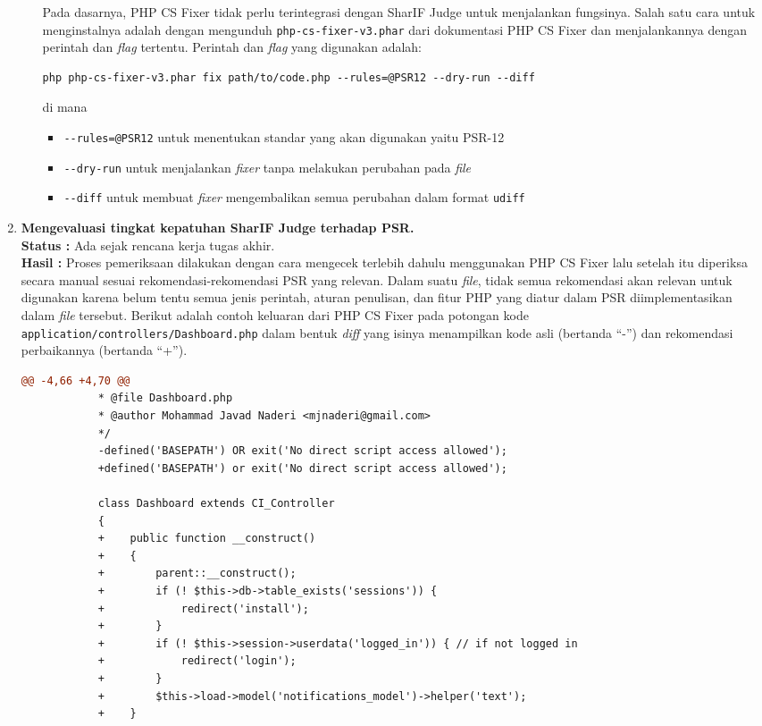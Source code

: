 \documentclass[a4paper,twoside]{article}
\begin{document}
\begin{enumerate}
\begin{enumerate}
			Pada dasarnya, PHP CS Fixer tidak perlu terintegrasi dengan SharIF Judge untuk menjalankan fungsinya. Salah satu cara untuk menginstalnya adalah dengan mengunduh \verb|php-cs-fixer-v3.phar| dari dokumentasi PHP CS Fixer dan menjalankannya dengan perintah dan \textit{flag} tertentu. Perintah dan \textit{flag} yang digunakan adalah:
			\begin{lstlisting}[basicstyle=\ttfamily, frame=single,
				columns=fullflexible, keepspaces=true, breaklines=true, label=ls:1]
				php php-cs-fixer-v3.phar fix path/to/code.php --rules=@PSR12 --dry-run --diff
			\end{lstlisting}
			di mana
			\begin{itemize}
				\item \verb|--rules=@PSR12| untuk menentukan standar yang akan digunakan yaitu PSR-12
				\item \verb|--dry-run| untuk menjalankan \textit{fixer} tanpa melakukan perubahan pada \textit{file}
				\item \verb|--diff| untuk membuat \textit{fixer} mengembalikan semua perubahan dalam format \verb|udiff|
			\end{itemize}
		\end{enumerate}
		
		
		\item \textbf{Mengevaluasi tingkat kepatuhan SharIF Judge terhadap PSR.}\\
		{\bf Status :} Ada sejak rencana kerja tugas akhir.\\
		{\bf Hasil :} Proses pemeriksaan dilakukan dengan cara mengecek terlebih dahulu menggunakan PHP CS Fixer lalu setelah itu diperiksa secara manual sesuai rekomendasi-rekomendasi PSR yang relevan. Dalam suatu \textit{file}, tidak semua rekomendasi akan relevan untuk digunakan karena belum tentu semua jenis perintah, aturan penulisan, dan fitur PHP yang diatur dalam PSR diimplementasikan dalam \textit{file} tersebut. Berikut adalah contoh keluaran dari PHP CS Fixer pada potongan kode \verb|application/controllers/Dashboard.php| dalam bentuk \textit{diff} yang isinya menampilkan kode asli (bertanda ``-'') dan rekomendasi perbaikannya (bertanda ``+''). 
		\begin{lstlisting}[frame=single,language=diff]  
			@@ -4,66 +4,70 @@
			* @file Dashboard.php
			* @author Mohammad Javad Naderi <mjnaderi@gmail.com>
			*/
			-defined('BASEPATH') OR exit('No direct script access allowed');
			+defined('BASEPATH') or exit('No direct script access allowed');
			
			class Dashboard extends CI_Controller
			{
			+    public function __construct()
			+    {
			+        parent::__construct();
			+        if (! $this->db->table_exists('sessions')) {
			+            redirect('install');
			+        }
			+        if (! $this->session->userdata('logged_in')) { // if not logged in
			+            redirect('login');
			+        }
			+        $this->load->model('notifications_model')->helper('text');
			+    }
				

\end{lstlisting}
\end{enumerate}
\end{document}
